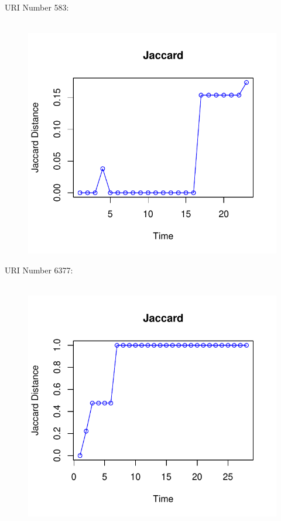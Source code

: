 \documentclass[12pt]{article}
\begin{document}
URI Number 583:\\
\begin{figure}[H]
    \centering
    \includegraphics[scale=0.7]{583.pdf}
\end{figure}

URI Number 6377:\\
\begin{figure}[H]
    \centering
    \includegraphics[scale=0.7]{6377.pdf}
\end{figure}
\end{document}
